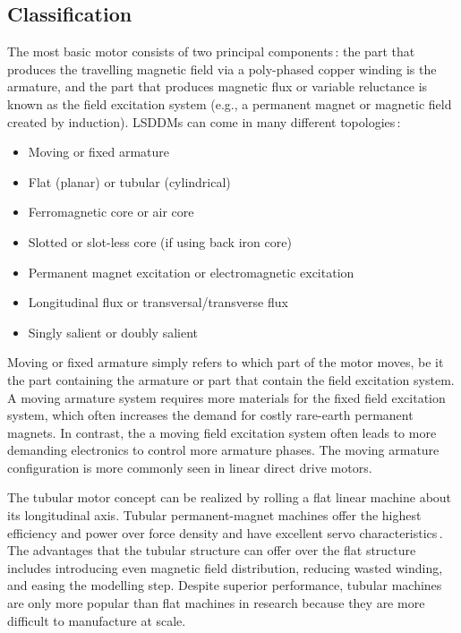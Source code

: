     \subsection{Classification}                     \label{Chapter:background/linear synchronous motors for NFJI/classification}
    
        
        The most basic motor consists of two principal components\,\cite{JacekF.GierasZbigniewJ.Piech2017}: the part that produces the travelling magnetic field via a poly-phased copper winding is the armature, and the part that produces magnetic flux or variable reluctance is known as the field excitation system (e.g., a permanent magnet or magnetic field created by induction). \acsp{LSDDM} can come in many different topologies\,\cite{Laithwaite1970}:
        
        
        \begin{itemize}
            \item Moving or fixed armature
            \item Flat (planar) or tubular (cylindrical)
            \item Ferromagnetic core or air core
            \item Slotted or slot-less core (if using back iron core)
            \item Permanent magnet excitation or electromagnetic excitation
            \item Longitudinal flux or transversal/transverse flux
            \item Singly salient or doubly salient
        \end{itemize}
        
        
        Moving or fixed armature simply refers to which part of the motor moves, be it the part containing the armature or part that contain the field excitation system. A moving armature system requires more materials for the fixed field excitation system, which often increases the demand for costly rare-earth permanent magnets. In contrast, the a moving field excitation system often leads to more demanding electronics to control more armature phases. The moving armature configuration is more commonly seen in linear direct drive motors. 
        
        
        The tubular motor concept can be realized by rolling a flat linear machine about its longitudinal axis. Tubular permanent-magnet machines offer the highest efficiency and power over force density and have excellent servo characteristics\,\cite{Eastham1990}. The advantages that the tubular structure can offer over the flat structure includes introducing even magnetic field distribution, reducing wasted winding, and easing the modelling step. Despite superior performance, tubular machines are only more popular than flat machines in research because they are more difficult to manufacture at scale.
        
